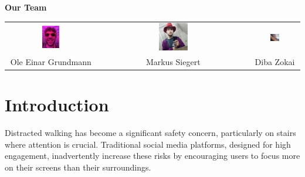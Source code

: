 \documentclass{article}
\begin{document}
\begin{titlepage}
    \begin{center}
        \textbf{\textcolor{TikTokBlack}{\Large Our Team}} \\[0.5cm]

        \begin{tabular}{ccc}
            \includegraphics[width=0.2\textwidth]{./resources/ole.png} &
            \includegraphics[width=0.2\textwidth]{./resources/markus.png} &
            \includegraphics[width=0.2\textwidth]{./resources/diba.png} \\[0.3cm]
            Ole Einar Grundmann & Markus Siegert & Diba Zokai \\
        \end{tabular}
    \end{center}
\end{titlepage}

\newpage
\tableofcontents
\newpage

\section{Introduction}
Distracted walking has become a significant safety concern, particularly on stairs where attention is crucial.
Traditional social media platforms, designed for high engagement,
inadvertently increase these risks by encouraging users to focus more on their screens than their surroundings.
\end{document}
